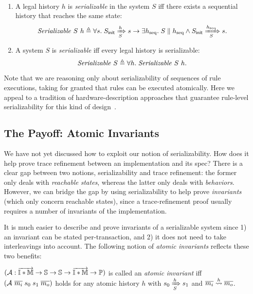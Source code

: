\documentclass[sigplan,10pt,review,anonymous,screen]{acmart}\settopmatter{printfolios=true,printccs=false,printacmref=false}
\begin{document}
\begin{definition}[Serializability]\mbox{}\\
  \begin{enumerate}
  \item A legal history $h$ is \emph{serializable} in the system $S$ iff there
    exists a sequential history that reaches the same state:
    \begin{displaymath}
      \hsrzl{S}{h} \triangleq \forall s.\; \semsteps{S}{\sysInit{S}}{h}{s} \to \exists h_{\textrm{seq}}.\; \hseq{S}{h_{\textrm{seq}}} \wedge \semsteps{S}{\sysInit{S}}{h_{\textrm{seq}}}{s}.
    \end{displaymath}
  \item A system $S$ is \emph{serializable} iff every legal history is serializable:
    \begin{displaymath}
      \hsrz{S} \triangleq \forall h.\; \hsrzl{S}{h}.
    \end{displaymath}
  \end{enumerate}
  \label{def-sz}
\end{definition}

Note that we are reasoning only about serializability of sequences of rule executions, taking for granted that rules can be executed atomically.
Here we appeal to a tradition of hardware-description approaches that guarantee rule-level serializability for this kind of design~\cite{fesi,kami,Murali:2015,Dave:2005,Dave:2007}.

\subsection{The Payoff: Atomic Invariants}
\label{sec-atomic-invariants}

We have not yet discussed how to exploit our notion of serializability.
How does it help prove trace refinement between an implementation and its spec?
There is a clear gap between two notions, serializability and trace refinement: the former only deals with \emph{reachable states}, whereas the latter only deals with \emph{behaviors}.
However, we can bridge the gap by using serializability to help prove \emph{invariants} (which only concern reachable states), since a trace-refinement proof usually requires a number of invariants of the implementation.

It is much easier to describe and prove invariants of a serializable system since 1) an invariant can be stated per-transaction, and 2) it does not need to take interleavings into account.
The following notion of \emph{atomic invariants} reflects these two benefits:
\begin{definition}
  $(\mathcal{A}: \listtof{\hidmt{}} \to \hsyst{} \to \hsyst{} \to \listtof{\hidmt{}} \to \propt{})$ is called an \emph{atomic invariant} iff $(\mathcal{A}\ \listof{m_i}\; s_0\; s_1\; \listof{m_o})$ holds for any atomic history $h$ with $\semsteps{S}{s_0}{h}{s_1}$ and $\atomic{\listof{m_i}}{h}{\listof{m_o}}$.
  \label{def-atomic-invariant}
\end{definition}
\end{document}
